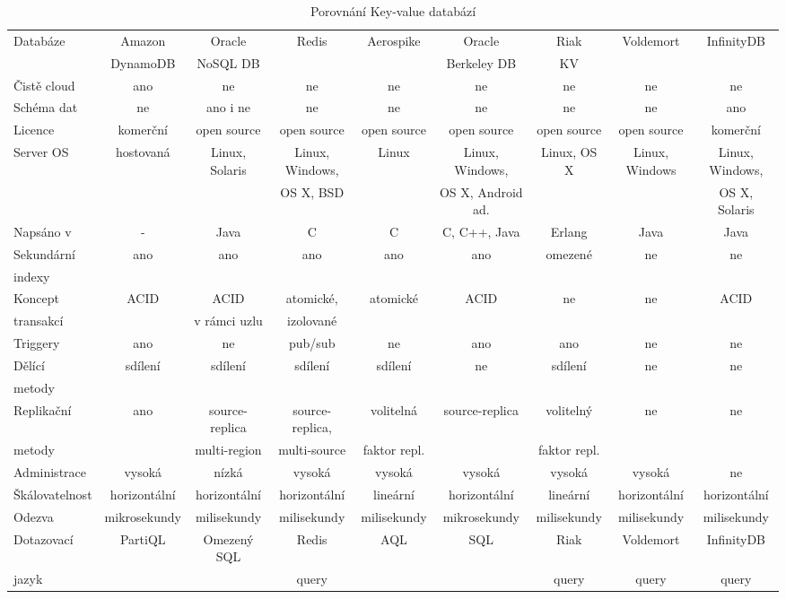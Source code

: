\documentclass[czech,master,dept460,male,csharp,cpdeclaration]{diploma}
\begin{document}
	\begin{table}
		\centering
		\scalebox{0.8}
		{
			\begin{tabular}{ l|c c c c c c c c } 
				\toprule
				Databáze & Amazon & Oracle & Redis & Aerospike & Oracle & Riak & Voldemort & InfinityDB \\
				& DynamoDB & NoSQL DB & & & Berkeley DB & KV & & \\
				\midrule
				Čistě cloud & ano & ne & ne & ne & ne & ne & ne & ne \\
				Schéma dat & ne & ano i ne & ne & ne & ne & ne & ne & ano \\
				Licence & komerční & open source & open source & open source & open source & open source & open source & komerční \\
				Server OS & hostovaná & Linux, Solaris & Linux, Windows, & Linux & Linux, Windows, & Linux, OS X & Linux, Windows &  Linux, Windows, \\
				& & & OS X, BSD & & OS X, Android ad. & & & OS X, Solaris\\
				Napsáno v & - & Java & C & C & C, C++, Java & Erlang & Java & Java\\
				Sekundární & ano & ano & ano & ano & ano & omezené & ne & ne \\
				indexy & & & & & & & & \\
				Koncept & ACID & ACID & atomické, & atomické & ACID & ne & ne & ACID \\
				transakcí & & v rámci uzlu & izolované & & & & & \\
				Triggery & ano & ne & pub/sub & ne & ano & ano & ne & ne \\
				Dělící & sdílení & sdílení & sdílení & sdílení & ne & sdílení & ne & ne \\ 
				metody \\
				Replikační & ano & source-replica & source-replica, & volitelná & source-replica & volitelný & ne & ne \\
				metody & & multi-region & multi-source & faktor repl. & & faktor repl. \\
				Administrace & vysoká & nízká & vysoká & vysoká & vysoká & vysoká & vysoká & ne\\
				Škálovatelnost & horizontální & horizontální & horizontální & lineární & horizontální & lineární & horizontální & horizontální\\
				Odezva & mikrosekundy & milisekundy & milisekundy & milisekundy & mikrosekundy & milisekundy & milisekundy & milisekundy \\
				Dotazovací & PartiQL & Omezený SQL & Redis & AQL & SQL & Riak & Voldemort & InfinityDB \\
				jazyk & & & query & & & query & query & query \\
				\bottomrule
			\end{tabular}}%
			\caption{Porovnání Key-value databází\label{tab_kvdb_compare}}
		
	\end{table}
	
\end{document}
